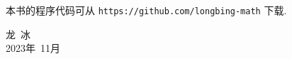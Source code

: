 本书的程序代码可从 \verb|https://github.com/longbing-math| 下载.



{\kaishu
	\begin{center}
		\hspace*{88mm}龙\,   冰\\
		\hspace*{88mm}2023年~11月
	\end{center}
}


